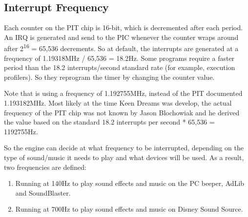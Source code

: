 \documentclass[book.tex]{subfiles}
\begin{document}
\subsection{Interrupt Frequency}
Each counter on the PIT chip is 16-bit, which is decremented after each period. An IRQ is generated and send to the PIC whenever the counter wraps around after 2\textsuperscript{16} = 65,536 decrements. So at default, the interrupts are generated at a frequency of 1.19318MHz / 65,536 = 18.2Hz. Some programs require a faster period than the 18.2 interrupts/second standard rate (for example, execution profilers). So they reprogram the timer by changing the counter value.\\
\par
\begin{minipage}{\textwidth}

\end{minipage}
\par
Note that  is using a frequency of 1.192755MHz, instead of the PIT documented 1.193182MHz. Most likely at the time Keen Dreams was develop, the actual frequency of the PIT chip was not known by Jason Blochowiak and he derived the value based on the standard 18.2 interrupts per second * 65,536 = 1192755Hz.\\
\par
So the engine can decide at what frequency to be interrupted, depending on the type of sound/music it needs to play and what devices will be used. As a result, two frequencies are defined: 
\begin{enumerate}
\item Running at 140Hz to play sound effects and music on the PC beeper, AdLib and SoundBlaster.
\item Running at 700Hz to play sound effects and music on Disney Sound Source.
\end{enumerate}
\par
\begin{minipage}{\textwidth}

\end{minipage}
\par
\end{document}

